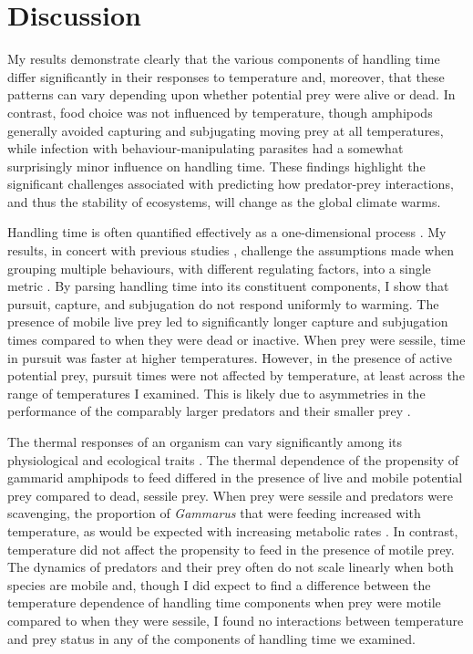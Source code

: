 \section{Discussion}

My results demonstrate clearly that the various components of handling time differ significantly in their responses to temperature and, moreover, that these patterns can vary depending upon whether potential prey were alive or dead. In contrast, food choice was not influenced by temperature, though amphipods generally avoided capturing and subjugating moving prey at all temperatures, while infection with behaviour-manipulating parasites had a somewhat surprisingly minor influence on handling time. These findings highlight the significant challenges associated with predicting how predator-prey interactions, and thus the stability of ecosystems, will change as the global climate warms.

Handling time is often quantified effectively as a one-dimensional process \citep{jeschke2002}. My results, in concert with previous studies \citep{jeschke2002, sentis2013}, challenge the assumptions made when grouping multiple behaviours, with different regulating factors, into a single metric \citep{enlund2011, sentis2013}. By parsing handling time into its constituent components, I show that pursuit, capture, and subjugation do not respond uniformly to warming. The presence of mobile live prey led to significantly longer capture and subjugation times compared to when they were dead or inactive. When prey were sessile, time in pursuit was faster at higher temperatures. However, in the presence of active potential prey, pursuit times were not affected by temperature, at least across the range of temperatures I examined. This is likely due to asymmetries in the performance of the comparably larger predators and their smaller prey \citep{dell2014}.  

The thermal responses of an organism can vary significantly among its physiological and ecological traits \citep{dell2011}. The thermal dependence of the propensity of gammarid amphipods to feed differed in the presence of live and mobile potential prey compared to dead, sessile prey. When prey were sessile and predators were scavenging, the proportion of \emph{Gammarus} that were feeding increased with temperature, as would be expected with increasing metabolic rates \citep{brown2004, schmidlin2015, labaude2016}.  In contrast, temperature did not affect the propensity to feed in the presence of motile prey. The dynamics of predators and their prey often do not scale linearly when both species are mobile \citep{dell2014} and, though I did expect to find a difference between the temperature dependence of handling time components when prey were motile compared to when they were sessile, I found no interactions between temperature and prey status in any of the components of handling time we examined. 

